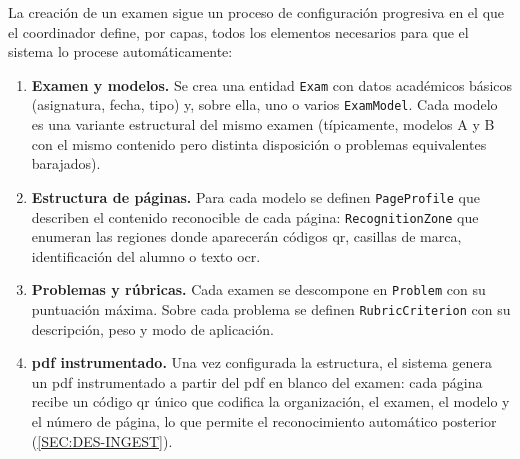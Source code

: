 La creación de un examen sigue un proceso de configuración progresiva
en el que el coordinador define, por capas, todos los elementos
necesarios para que el sistema lo procese automáticamente:

\begin{enumerate}

  \item \textbf{Examen y modelos.} Se crea una entidad \texttt{Exam}
  con datos académicos básicos (asignatura, fecha, tipo) y, sobre ella,
  uno o varios \texttt{ExamModel}. Cada modelo es una variante
  estructural del mismo examen (típicamente, modelos A y B con el
  mismo contenido pero distinta disposición o problemas equivalentes
  barajados).

  \item \textbf{Estructura de páginas.} Para cada modelo se definen
  \texttt{PageProfile} que describen el contenido reconocible de cada
  página: \texttt{RecognitionZone} que enumeran las regiones donde
  aparecerán códigos \acs{qr}, casillas de marca, identificación del
  alumno o texto \acs{ocr}.

  \item \textbf{Problemas y rúbricas.} Cada examen se descompone en
  \texttt{Problem} con su puntuación máxima. Sobre cada problema se
  definen \texttt{RubricCriterion} con su descripción, peso y modo de
  aplicación.

  \item \textbf{\acs{pdf} instrumentado.} Una vez configurada la
  estructura, el sistema genera un \acs{pdf} instrumentado a partir
  del \acs{pdf} en blanco del examen: cada página recibe un código
  \acs{qr} único que codifica la organización, el examen, el modelo y
  el número de página, lo que permite el reconocimiento automático
  posterior (\cref{SEC:DES-INGEST}).

\end{enumerate}
